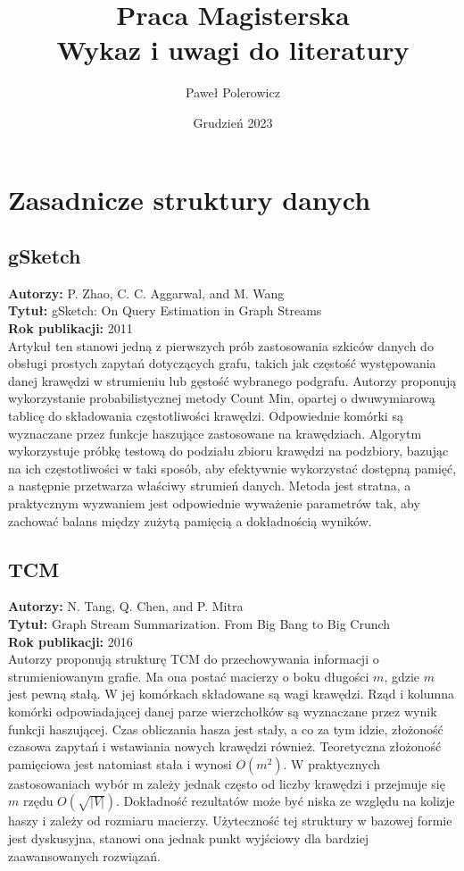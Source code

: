 \documentclass{article}
\title{\textbf{Praca Magisterska \\
    Wykaz i uwagi do literatury}}
\author{Paweł Polerowicz}
\date{Grudzień 2023}
\begin{document}
    \maketitle
    \section{Zasadnicze struktury danych}
        \subsection{gSketch\cite{Zhao_Aggarwal_Wang_2011}}
            \textbf{Autorzy: } P. Zhao, C. C. Aggarwal, and M. Wang\\
            \textbf{Tytuł: } gSketch: On Query Estimation in Graph Streams\\
            \textbf{Rok publikacji: } 2011 \\
            Artykuł ten stanowi jedną z pierwszych prób zastosowania szkiców danych do obsługi prostych zapytań dotyczących grafu, takich jak częstość występowania danej krawędzi w strumieniu lub gęstość wybranego podgrafu. Autorzy proponują wykorzystanie probabilistycznej metody Count Min, opartej o dwuwymiarową tablicę do składowania częstotliwości krawędzi. Odpowiednie komórki są wyznaczane przez funkcje haszujące zastosowane na krawędziach. Algorytm wykorzystuje próbkę testową do podziału zbioru krawędzi na podzbiory, bazując na ich częstotliwości w taki sposób, aby efektywnie wykorzystać dostępną pamięć, a następnie przetwarza właściwy strumień danych. Metoda jest stratna, a praktycznym wyzwaniem jest odpowiednie wyważenie parametrów tak, aby zachować balans między zużytą pamięcią a dokładnością wyników.

        \subsection{TCM\cite{Tang_Chen_Mitra_2016}}
            \textbf{Autorzy: } N. Tang, Q. Chen, and P. Mitra\\
            \textbf{Tytuł: } Graph Stream Summarization.
            From Big Bang to Big Crunch\\
            \textbf{Rok publikacji: } 2016\\
            Autorzy proponują strukturę TCM do przechowywania informacji o strumieniowanym grafie. Ma ona postać macierzy o boku długości $m$, gdzie $m$ jest pewną stałą. W jej komórkach składowane są wagi krawędzi. Rząd i kolumna komórki odpowiadającej danej parze wierzchołków są wyznaczane przez wynik funkcji haszującej. Czas obliczania hasza jest stały, a co za tym idzie, złożoność czasowa zapytań i wstawiania nowych krawędzi również. Teoretyczna złożoność pamięciowa jest natomiast stała i wynosi $O(m^2)$. W praktycznych zastosowaniach wybór m zależy jednak często od liczby krawędzi i przejmuje się $m$ rzędu $O(\sqrt{|V|})$. Dokładność rezultatów może być niska ze względu na kolizje haszy i zależy od rozmiaru macierzy. Użyteczność tej struktury w bazowej formie jest dyskusyjna, stanowi ona jednak punkt wyjściowy dla bardziej zaawansowanych rozwiązań.
\end{document}
